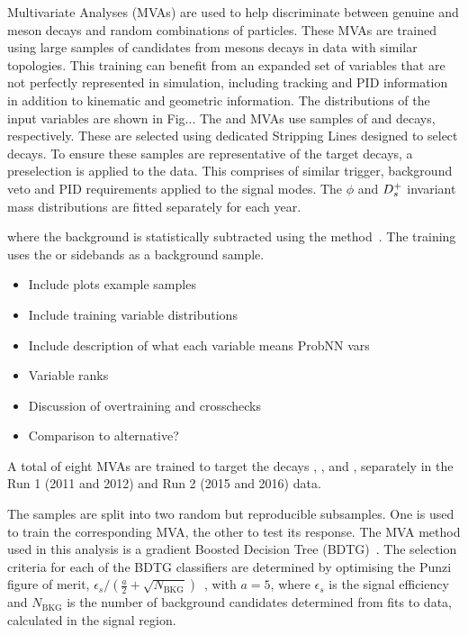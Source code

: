 Multivariate Analyses (MVAs) are used to help discriminate between genuine \Dsp and \phiz meson decays and random combinations of particles. 
These MVAs are trained using large samples of candidates from \B mesons decays in data with similar topologies. 
This training can benefit from an expanded set of variables that are not perfectly represented in simulation, including tracking and PID information in addition to kinematic and geometric information. The distributions of the input variables are shown in Fig... The \phiz and \Dsp MVAs use samples of \decay{\Bs}{\jpsi\phiz} and \decay{\Bsb}{\Dsp\pim} decays, respectively. These are selected using dedicated Stripping Lines designed to select decays. To ensure these samples are representative of the target decays, a preselection is applied to the data. This comprises of similar trigger, background veto and PID requirements applied to the signal modes.
The $\phi$ and ${{D}^+_{s}}$ invariant mass distributions are fitted separately for each year. 

 where the background is statistically subtracted using the \sPlot method~\cite{Pivk:2004ty}. The training uses the \phiz or \Dsp sidebands as a background sample.

{\color{Red}
\begin{itemize}
\item Include plots example samples
\item Include training variable distributions
\item Include description of what each variable means \eg ProbNN vars
\item Variable ranks
\item Discussion of overtraining and crosschecks
\item Comparison to alternative? 
\end{itemize}
}

A total of eight MVAs are trained to target the decays \decay{\phi}{\Kp\Km}, \decay{\Dsp}{\Kp\Km\pip}, \decay{\Dsp}{\Kp\pim\pip} and \decay{\Dsp}{\pip\pim\pip}, separately in the Run 1 (2011 and 2012) and Run 2 (2015 and 2016) data. 

The samples are split into two random but reproducible subsamples. One is used to train the corresponding MVA, the other to test its response. 
The MVA method used in this analysis is a gradient Boosted Decision Tree (BDTG)~\cite{Breiman}. The selection criteria for each of the BDTG classifiers are determined by optimising the Punzi figure of merit, $\epsilon_{s}/ (\frac{a}{2} + \sqrt{N_{\text{BKG}}})$~\cite{Punzi:2003bu}, with $a=5$, where $\epsilon_{s}$ is the signal efficiency and $N_{\text{BKG}}$ is the number of background candidates determined from fits to data, calculated in the signal region.

